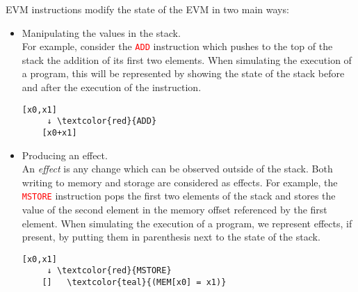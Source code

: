 EVM instructions modify the state of the EVM in two main ways:
\begin{itemize}
    \item Manipulating the values in the stack. \\
    For example, consider the \textcolor{red}{\texttt{ADD}} instruction which
    pushes to the top of the stack the addition of its first two elements.
    When simulating the execution of a program, this will be represented by
    showing the state of the stack before and after the execution of the 
    instruction. 
    \begin{Verbatim}[commandchars=\\\{\}]
    [x0,x1] 
     ↓ \textcolor{red}{ADD}
    [x0+x1]
    \end{Verbatim}

    \item Producing an effect. \\
    An \emph{effect} is any change which can be observed outside of the stack.
    Both writing to memory and storage are considered as effects. For example,
    the \textcolor{red}{\texttt{MSTORE}} instruction pops the first two elements
    of the stack and stores the value of the second element in the memory offset
    referenced by the first element. When simulating the execution of a program, 
    we represent effects, if present, by putting them in parenthesis next to the 
    state of the stack.
    \begin{Verbatim}[commandchars=\\\{\}]
    [x0,x1]
     ↓ \textcolor{red}{MSTORE}
    []   \textcolor{teal}{(MEM[x0] = x1)}
    \end{Verbatim} 
\end{itemize}

